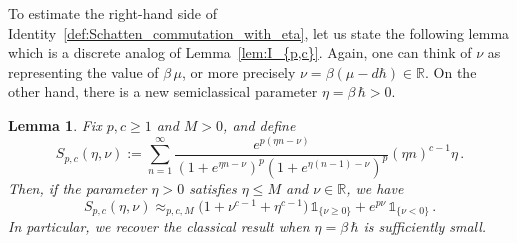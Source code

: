 \documentclass[11pt]{amsart}
\theoremstyle{plain}
\newtheorem{lem}[theorem]{Lemma}
\theoremstyle{definition}
\newcommand		{\RR}		{\mathbb R}			%
\newcommand		{\R}		{\RR}
\newcommand		{\lt}			{\left}				%
\newcommand		{\rt}			{\right}			%
\renewcommand	{\(}			{\lt(}
\renewcommand	{\)}			{\rt)}
\newcommand		{\indic}	{\mathds{1}}		%
\begin{document}
	To estimate the right-hand side of Identity~\eqref{def:Schatten_commutation_with_eta}, let us state the following lemma which is a discrete analog of Lemma~\ref{lem:I_{p,c}}. Again, one can think of $\nu$ as representing the value of $\beta\,\mu$, or more precisely $\nu = \beta\lt(\mu-d\hbar\rt) \in\R$. On the other hand, there is a new semiclassical parameter $\eta = \beta\,\hbar > 0$.

	\begin{lem}\label{lem:S_{p,c}}
		Fix $p, c \ge 1$ and $M>0$, and define
		\begin{equation*}
			S_{p,c}(\eta,\nu) := \sum^\infty_{n=1} \frac{e^{p\lt(\eta n-\nu\rt)}}{\lt(1+e^{\eta n-\nu}\rt)^p \lt(1+e^{\eta \lt(n-1\rt)-\nu}\rt)^p} \lt(\eta n\rt)^{c-1} \eta \, .
		\end{equation*}
		Then, if the parameter $\eta> 0$ satisfies $\eta \le M$ and $\nu \in \R$, we have
		\begin{equation*}
			S_{p,c}(\eta,\nu) \approx_{p,c,M} \bigl(1 + \nu^{c-1} + \eta^{c-1}\bigr) \, \indic_{\{\nu \ge 0\}} + e^{p\nu} \, \indic_{\{\nu < 0\}}\,.
		\end{equation*}
		In particular, we recover the classical result when $\eta = \beta\,\hbar$ is sufficiently small.
	\end{lem}
\end{document}
